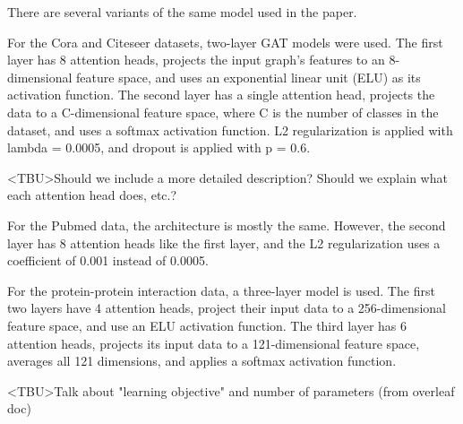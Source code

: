 There are several variants of the same model used in the paper.

For the Cora and Citeseer datasets, two-layer GAT models were used.  The first
layer has 8 attention heads, projects the input graph's features to an
8-dimensional feature space, and uses an exponential linear unit (ELU) as its
activation function.  The second layer has a single attention head, projects
the data to a C-dimensional feature space, where C is the number of classes in
the dataset, and uses a softmax activation function.  L2 regularization is
applied with lambda = 0.0005, and dropout is applied with p = 0.6.

<TBU>Should we include a more detailed description? Should we explain what each
attention head does, etc.?

For the Pubmed data, the architecture is mostly the same. However, the second
layer has 8 attention heads like the first layer, and the L2 regularization
uses a coefficient of 0.001 instead of 0.0005.

For the protein-protein interaction data, a three-layer model is used. The
first two layers have 4 attention heads, project their input data to a
256-dimensional feature space, and use an ELU activation function. The third
layer has 6 attention heads, projects its input data to a 121-dimensional
feature space, averages all 121 dimensions, and applies a softmax activation
function.

<TBU>Talk about "learning objective" and number of parameters (from overleaf doc)
